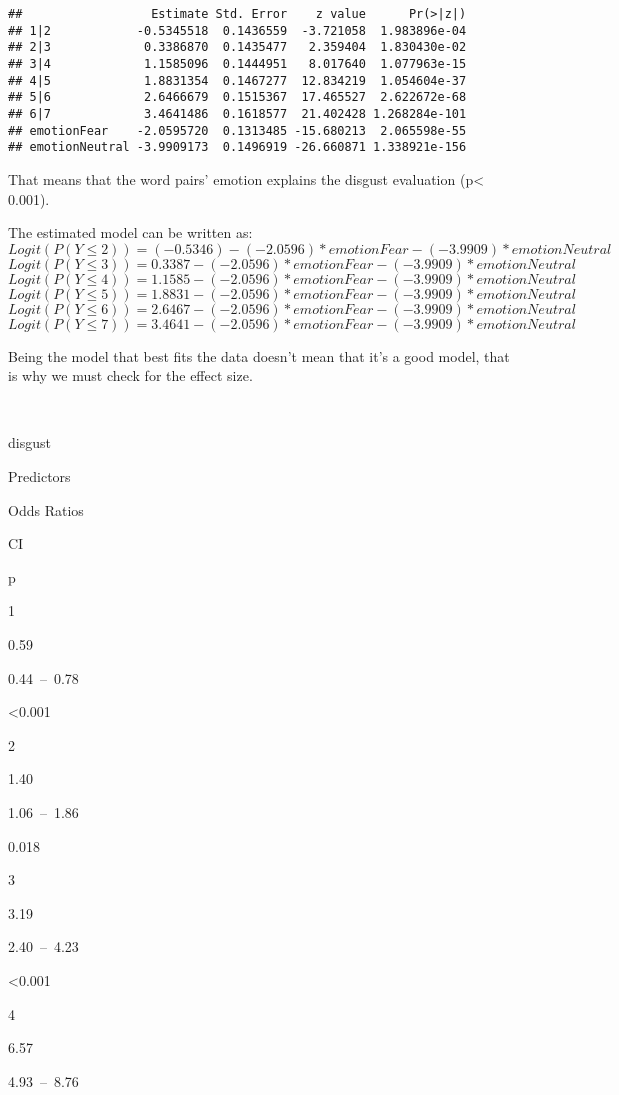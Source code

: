 \documentclass[
]{article}
\begin{document}
\begin{verbatim}
##                  Estimate Std. Error    z value      Pr(>|z|)
## 1|2            -0.5345518  0.1436559  -3.721058  1.983896e-04
## 2|3             0.3386870  0.1435477   2.359404  1.830430e-02
## 3|4             1.1585096  0.1444951   8.017640  1.077963e-15
## 4|5             1.8831354  0.1467277  12.834219  1.054604e-37
## 5|6             2.6466679  0.1515367  17.465527  2.622672e-68
## 6|7             3.4641486  0.1618577  21.402428 1.268284e-101
## emotionFear    -2.0595720  0.1313485 -15.680213  2.065598e-55
## emotionNeutral -3.9909173  0.1496919 -26.660871 1.338921e-156
\end{verbatim}

That means that the word pairs' emotion explains the disgust evaluation
(p\textless{} 0.001).

The estimated model can be written as:
\[Logit(P(Y\le 2))= (-0.5346) - (-2.0596)*emotionFear - (-3.9909)*emotionNeutral\]
\[Logit(P(Y\le 3))= 0.3387 - (-2.0596)*emotionFear - (-3.9909)*emotionNeutral\]
\[Logit(P(Y\le 4))= 1.1585 - (-2.0596)*emotionFear - (-3.9909)*emotionNeutral\]
\[Logit(P(Y\le 5))= 1.8831 - (-2.0596)*emotionFear - (-3.9909)*emotionNeutral\]
\[Logit(P(Y\le 6))= 2.6467 - (-2.0596)*emotionFear - (-3.9909)*emotionNeutral\]
\[Logit(P(Y\le 7))= 3.4641 - (-2.0596)*emotionFear - (-3.9909)*emotionNeutral\]

Being the model that best fits the data doesn't mean that it's a good
model, that is why we must check for the effect size.

~

disgust

Predictors

Odds Ratios

CI

p

1

0.59

0.44~--~0.78

\textless0.001

2

1.40

1.06~--~1.86

0.018

3

3.19

2.40~--~4.23

\textless0.001

4

6.57

4.93~--~8.76
\end{document}
